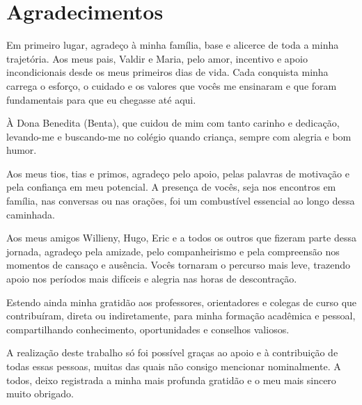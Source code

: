 \chapter*{Agradecimentos}

Em primeiro lugar, agrade\c{c}o \`a minha fam\'ilia, base e alicerce de
toda a minha trajet\'oria. Aos meus pais, Valdir e Maria, pelo amor,
incentivo e apoio incondicionais desde os meus primeiros dias de vida.
Cada conquista minha carrega o esfor\c{c}o, o cuidado e os valores que
voc\^es me ensinaram e que foram fundamentais para que eu chegasse at\'e
aqui.

\`A Dona Benedita (Benta), que cuidou de mim com tanto carinho e
dedica\c{c}\~ao, levando-me e buscando-me no col\'egio quando crian\c{c}a,
sempre com alegria e bom humor.

Aos meus tios, tias e primos, agrade\c{c}o pelo apoio, pelas palavras de
motiva\c{c}\~ao e pela confian\c{c}a em meu potencial. A presen\c{c}a de
voc\^es, seja nos encontros em fam\'ilia, nas conversas ou nas ora\c{c}\~oes,
foi um combust\'ivel essencial ao longo dessa caminhada.

Aos meus amigos Willieny, Hugo, Eric e a todos os outros que fizeram
parte dessa jornada, agrade\c{c}o pela amizade, pelo companheirismo e pela
compreens\~ao nos momentos de cansa\c{c}o e aus\^encia. Voc\^es tornaram o
percurso mais leve, trazendo apoio nos per\'iodos mais dif\'iceis e alegria
nas horas de descontra\c{c}\~ao.

Estendo ainda minha gratid\~ao aos professores, orientadores e colegas de
curso que contribu\'iram, direta ou indiretamente, para minha forma\c{c}\~ao
acad\^emica e pessoal, compartilhando conhecimento, oportunidades e
conselhos valiosos.

A realiza\c{c}\~ao deste trabalho s\'o foi poss\'ivel gra\c{c}as ao apoio e
\`a contribui\c{c}\~ao de todas essas pessoas, muitas das quais n\~ao
consigo mencionar nominalmente. A todos, deixo registrada a minha mais
profunda gratid\~ao e o meu mais sincero muito obrigado.
